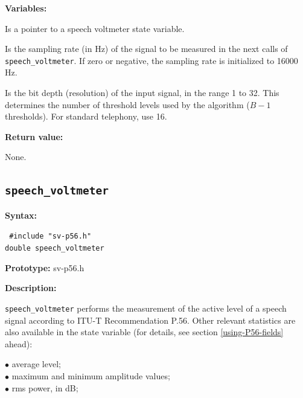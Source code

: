 {\bf Variables: }
\begin{Descr}{\DescrLen}
\item[\pbox{20mm}{\em state}] %
               Is a pointer to a speech voltmeter state variable. 

\item[\pbox{20mm}{\em f}] %
               Is the sampling rate (in Hz) of the signal to be measured in
               the next calls of {\tt speech\_voltmeter}. If zero or 
               negative, the sampling rate is initialized to 16000 Hz.

\item[\pbox{20mm}{\em bitno}] %
               Is the bit depth (resolution) of the input signal, in the
               range 1 to 32. This determines the number of threshold levels
               used by the algorithm ($B-1$ thresholds). For standard
               telephony, use 16.
\end{Descr}
        
{\bf Return value: }      
               
None.


\subsection{{\tt speech\_voltmeter}}

{\bf Syntax: } 

{\tt
\#include "sv-p56.h"\\
double speech\_voltmeter
}

{\bf Prototype: }       sv-p56.h

{\bf Description: }

{\tt speech\_voltmeter} performs the measurement of the active level of
a speech signal according to ITU-T Recommendation P.56. Other relevant
statistics are also available in the state variable (for details, see
section \ref{using-P56-fields} ahead):

\begin{minipage}{130mm}
 $\bullet$ average level;\\
 $\bullet$ maximum and minimum amplitude values;\\
 $\bullet$ rms power, in dB;\\
\end{minipage}


